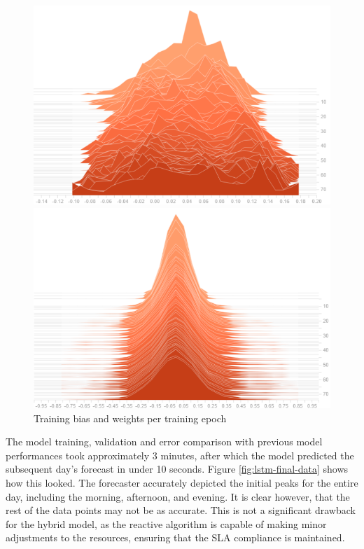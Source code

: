 \begin{figure}[htb]
    \centering
    \caption{Training bias and weights per training epoch}
    \label{fig:bias-weight-training}
    \begin{minipage}{0.6\linewidth}
        \includegraphics[width=1.0\linewidth]{Figures/LSTM-Bias.pdf}
    \end{minipage}\hfill
    \begin{minipage}{0.6\linewidth}
        \includegraphics[width=1.0\linewidth]{Figures/LSTM-Weights.pdf}
    \end{minipage}
\end{figure}

The model training, validation and error comparison with previous model performances took approximately 3 minutes, after which the model predicted the subsequent day's forecast in under 10 seconds. Figure \ref{fig:lstm-final-data} shows how this looked. The forecaster accurately depicted the initial peaks for the entire day, including the morning, afternoon, and evening. It is clear however, that the rest of the data points may not be as accurate. This is not a significant drawback for the hybrid model, as the reactive algorithm is capable of making minor adjustments to the resources, ensuring that the SLA compliance is maintained.

